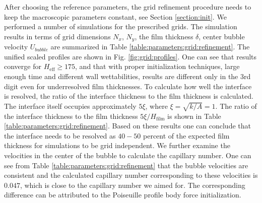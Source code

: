 \documentclass[preprint,12pt]{elsarticle}
\begin{document}
{\color{red} After choosing the reference parameters, the grid refinement procedure
needs to keep the macroscopic parameters constant, see Section \ref{section:init}.}  
We performed a number of simulations for the prescribed grids. The
simulation results in terms of grid dimensions $N_x$, $N_y$, the film thickness $\delta$, center
bubble
velocity $U_{bubble}$ are summarized in Table \ref{table:parameters:grid:refinement}.
The unified scaled profiles are shown in Fig. \ref{fig:grid:profiles}. One can
see that results converge for $H_{\mathrm{eff}}\geq 175$, and that with proper
initialization techniques, large enough time and different wall
wettabilities, results are different only in the 3rd digit even for
underresolved film thicknesses. To calculate how well the interface is
resolved, the ratio of the interface thickness to the film thickness is calculated. The
interface itself occupies approximately $5 \xi$, where
$\xi=\sqrt{k/A}=1$. The ratio of the interface thickness to the film thickness
$5\xi/H_{\mathrm{film}}$
 is shown in Table \ref{table:parameters:grid:refinement}. Based on these results one can conclude that
 the interface needs to be resolved as $40-50$ percent of the
expected film thickness for simulations to be grid independent. We further examine the
velocities in the center of the bubble to calculate the capillary number. One can see from Table
\ref{table:parameters:grid:refinement} that the bubble velocities are consistent and the
calculated capillary number corresponding to these velocities is $0.047$, which is {\color{red}
close to} the capillary number we aimed for. The corresponding difference can be
attributed to the Poiseuille profile body force initialization.%
\end{document}
